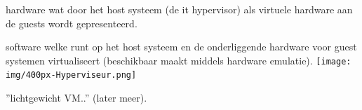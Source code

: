 \begin{styleframe}
    \frametitle{}
\begin{description}[blaat]
	\item[hardware emulatie] hardware wat door het host systeem (de {it hypervisor}) als virtuele hardware aan de guests wordt gepresenteerd.
	\pause
	\item[hypervisor] software welke runt op het host systeem en de onderliggende hardware voor guest systemen virtualiseert (beschikbaar maakt middels hardware emulatie).
	\pause
	\texttt{[image: img/400px-Hyperviseur.png]}\\
	\pause
	\item[container] ''lichtgewicht VM..'' (later meer).
\end{description}
\end{styleframe}

